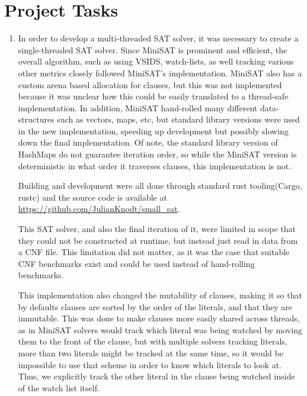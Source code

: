 \documentclass[11pt]{extarticle}
\begin{document}
\section*{Project Tasks}
\begin{enumerate}
\item
In order to develop a multi-threaded SAT solver, it was necessary to create a single-threaded
SAT solver. Since MiniSAT is prominent and efficient, the overall algorithm, such as using
VSIDS, watch-lists, as well tracking various other metrics closely followed MiniSAT's
implementation. MiniSAT also has a custom arena based allocation for clauses, but this was not
implemented because it was unclear how this could be easily translated to a thread-safe
implementation. In addition, MiniSAT hand-rolled many different data-structures such as vectors,
maps, etc, but standard library versions were used in the new implementation, speeding up
development but possibly slowing down the final implementation. Of note, the standard library
version of HashMaps do not guarantee iteration order, so while the MiniSAT version is
deterministic in what order it traverses clauses, this implementation is not.

Building and development were all done through standard rust tooling(Cargo, rustc) and the
source code is available at \url{https://github.com/JulianKnodt/small_sat}.

This SAT solver, and also the final iteration of it, were limited in scope that they
could not be constructed at runtime, but instead just read in data from a CNF file\cite{cnf}.
This limitation did not matter, as it was the case that suitable CNF benchmarks exist and could
be used instead of hand-rolling benchmarks.

This implementation also changed the mutability of clauses, making it so that by defaults
clauses are sorted by the order of the literals, and that they are immutable. This was done to
make clauses more easily shared across threads, as in MiniSAT solvers would track which literal
was being watched by moving them to the front of the clause, but with multiple solvers tracking
literals, more than two literals might be tracked at the same time, so it would be impossible to
use that scheme in order to know which literals to look at. Thus, we explicitly track the other
literal in the clause being watched inside of the watch list itself.


\end{enumerate}
\end{document}
